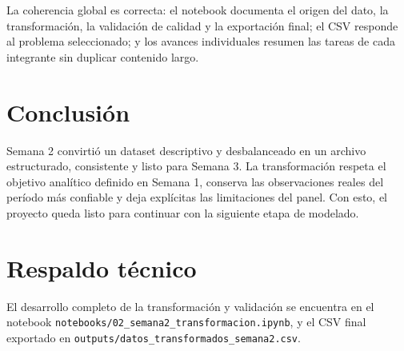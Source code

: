 \documentclass[12pt,a4paper]{article}
\begin{document}
La coherencia global es correcta: el notebook documenta el origen del dato, la transformación, la validación de calidad y la exportación final; el CSV responde al problema seleccionado; y los avances individuales resumen las tareas de cada integrante sin duplicar contenido largo.

\section{Conclusión}

Semana 2 convirtió un dataset descriptivo y desbalanceado en un archivo estructurado, consistente y listo para Semana 3. La transformación respeta el objetivo analítico definido en Semana 1, conserva las observaciones reales del período más confiable y deja explícitas las limitaciones del panel. Con esto, el proyecto queda listo para continuar con la siguiente etapa de modelado.

\section{Respaldo técnico}

El desarrollo completo de la transformación y validación se encuentra en el notebook \texttt{notebooks/02\_semana2\_transformacion.ipynb}, y el CSV final exportado en \texttt{outputs/datos\_transformados\_semana2.csv}.
\end{document}
